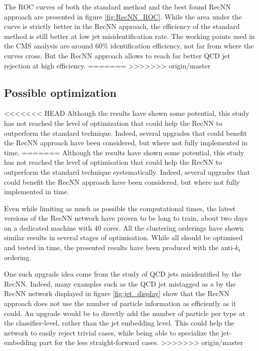 The ROC curves of both the standard method and the best found RecNN approach are presented in figure \ref{fig:RecNN_ROC}. While the area under the curve is strictly better in the RecNN approach, the efficiency of the standard method is still better at low jet misidentification rate. The working points used in the CMS analysis are around 60$\%$ identification efficiency, not far from where the curves cross. But the RecNN approach allows to reach far better QCD jet rejection at high \tauh efficiency.
=======
>>>>>>> origin/master

\subsection{Possible optimization}

<<<<<<< HEAD
Although the results have shown some potential, this study has not reached the level of optimization that could help the RecNN to outperform the standard technique. Indeed, several upgrades that could benefit the RecNN approach have been considered, but where not fully implemented in time. 
=======
Although the results have shown some potential, this study has not reached the level of optimisation that could help the RecNN to outperform the standard technique systematically. Indeed, several upgrades that could benefit the RecNN approach have been considered, but where not fully implemented in time. 

Even while limiting as much as possible the computational times, the latest versions of the RecNN network have proven to be long to train, about two days on a dedicated machine with 40 cores. All the clustering orderings have shown similar results in several stages of optimisation. While all should be optimised and tested in time, the presented results have been produced with the anti-$k_t$ ordering.

One such upgrade idea come from the study of QCD jets misidentified by the RecNN. Indeed, many examples such as the QCD jet mistagged as a \tauh by the RecNN network displayed in figure \ref{fig:jet_display} show that the RecNN approach does not use the number of particle information as efficiently as it could. An upgrade would be to directly add the number of particle per type at the classifier-level, rather than the jet embedding level. This could help the network to easily reject trivial cases, while being able to specialize the jet-embedding part for the less straight-forward cases.
>>>>>>> origin/master

